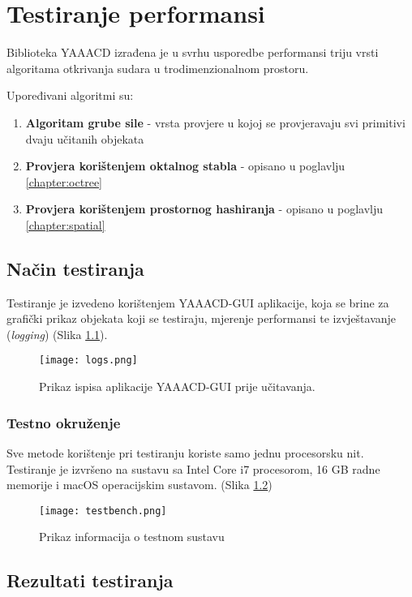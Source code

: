 \chapter{Testiranje performansi}

Biblioteka YAAACD izrađena je u svrhu usporedbe performansi triju vrsti
algoritama otkrivanja sudara u trodimenzionalnom prostoru.

Upoređivani algoritmi su:
\begin{enumerate}
    \item \textbf{Algoritam grube sile} - vrsta provjere u kojoj se
          provjeravaju svi primitivi dvaju učitanih objekata
    \item \textbf{Provjera korištenjem oktalnog stabla} - opisano u poglavlju \ref{chapter:octree}
    \item \textbf{Provjera korištenjem prostornog hashiranja} - opisano u poglavlju \ref{chapter:spatial}
\end{enumerate}

\section{Način testiranja}

Testiranje je izvedeno korištenjem YAAACD-GUI aplikacije, koja se brine za grafički prikaz
objekata koji se testiraju, mjerenje performansi te izvještavanje (\textit{logging}) (Slika \ref{logging}).

\begin{figure}[h!]
    \centering
    \texttt{[image: logs.png]}
    \caption {Prikaz ispisa aplikacije YAAACD-GUI prije učitavanja.}
    \label{logging}
\end{figure}

\pagebreak
\subsection{Testno okruženje}
Sve metode korištenje pri testiranju koriste samo jednu procesorsku nit.
Testiranje je izvršeno na sustavu sa Intel Core i7 procesorom, 16 GB radne memorije
i macOS operacijskim sustavom. (Slika \ref{testbench})

\begin{figure}[h!]
    \centering
    \texttt{[image: testbench.png]}
    \caption {Prikaz informacija o testnom sustavu}
    \label{testbench}
\end{figure}

\pagebreak
\section{Rezultati testiranja}

